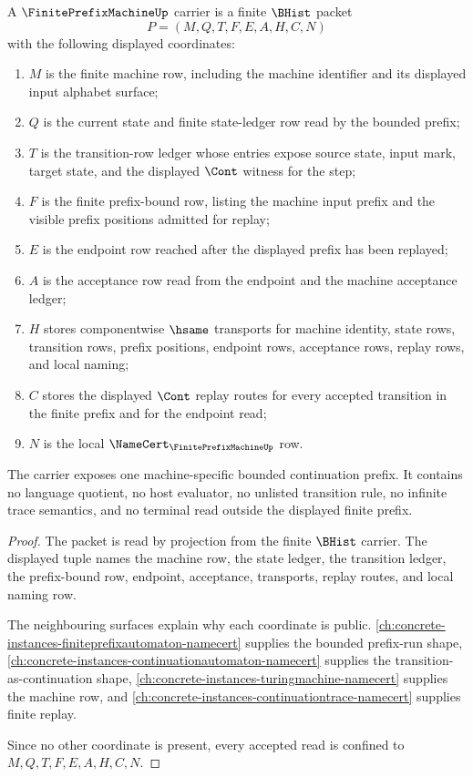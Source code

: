\begin{theorem}
\label{thm:finite-prefix-machine-carrier}
A $\FinitePrefixMachineUp$ carrier is a finite $\BHist$ packet
$$
P=(M,Q,T,F,E,A,H,C,N)
$$
with the following displayed coordinates:
\begin{enumerate}
\item $M$ is the finite machine row, including the machine identifier and its displayed input alphabet surface;
\item $Q$ is the current state and finite state-ledger row read by the bounded prefix;
\item $T$ is the transition-row ledger whose entries expose source state, input mark, target state, and the displayed $\Cont$ witness for the step;
\item $F$ is the finite prefix-bound row, listing the machine input prefix and the visible prefix positions admitted for replay;
\item $E$ is the endpoint row reached after the displayed prefix has been replayed;
\item $A$ is the acceptance row read from the endpoint and the machine acceptance ledger;
\item $H$ stores componentwise $\hsame$ transports for machine identity, state rows, transition rows, prefix positions, endpoint rows, acceptance rows, replay rows, and local naming;
\item $C$ stores the displayed $\Cont$ replay routes for every accepted transition in the finite prefix and for the endpoint read;
\item $N$ is the local $\NameCert_{\FinitePrefixMachineUp}$ row.
\end{enumerate}
The carrier exposes one machine-specific bounded continuation prefix. It contains no language quotient, no host evaluator, no unlisted transition rule, no infinite trace semantics, and no terminal read outside the displayed finite prefix.
\end{theorem}
\begin{proof}
The packet is read by projection from the finite $\BHist$ carrier. The displayed tuple names the machine row, the state ledger, the transition ledger, the prefix-bound row, endpoint, acceptance, transports, replay routes, and local naming row.

The neighbouring surfaces explain why each coordinate is public. \autoref{ch:concrete-instances-finiteprefixautomaton-namecert} supplies the bounded prefix-run shape, \autoref{ch:concrete-instances-continuationautomaton-namecert} supplies the transition-as-continuation shape, \autoref{ch:concrete-instances-turingmachine-namecert} supplies the machine row, and \autoref{ch:concrete-instances-continuationtrace-namecert} supplies finite replay.

Since no other coordinate is present, every accepted read is confined to $M,Q,T,F,E,A,H,C,N$.
\end{proof}

